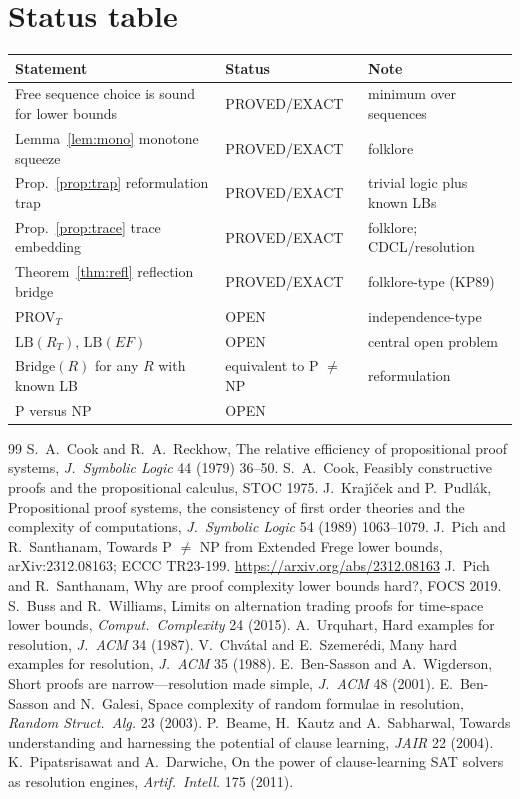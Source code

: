 \documentclass[11pt]{article}
\theoremstyle{definition}
\theoremstyle{remark}
\begin{document}
\section{Status table}
\begin{center}\small
\begin{tabular}{lll}
\toprule
Statement & Status & Note\\
\midrule
Free sequence choice is sound for lower bounds & PROVED/EXACT & minimum over sequences\\
Lemma~\ref{lem:mono} monotone squeeze & PROVED/EXACT & folklore\\
Prop.~\ref{prop:trap} reformulation trap & PROVED/EXACT & trivial logic plus known LBs\\
Prop.~\ref{prop:trace} trace embedding & PROVED/EXACT & folklore; CDCL/resolution\\
Theorem~\ref{thm:refl} reflection bridge & PROVED/EXACT & folklore-type (KP89)\\
PROV$_T$ & OPEN & independence-type\\
$\mathrm{LB}(R_T)$, $\mathrm{LB}(EF)$ & OPEN & central open problem\\
Bridge$(R)$ for any $R$ with known LB & equivalent to P $\ne$ NP & reformulation\\
P versus NP & OPEN & \\
\bottomrule
\end{tabular}
\end{center}

\begin{thebibliography}{99}
 S.~A.~Cook and R.~A.~Reckhow, The relative efficiency of propositional proof systems, \emph{J.\ Symbolic Logic} 44 (1979) 36--50.
 S.~A.~Cook, Feasibly constructive proofs and the propositional calculus, STOC 1975.
 J.~Kraj\'{\i}\v{c}ek and P.~Pudl\'ak, Propositional proof systems, the consistency of first order theories and the complexity of computations, \emph{J.\ Symbolic Logic} 54 (1989) 1063--1079.
 J.~Pich and R.~Santhanam, Towards P $\ne$ NP from Extended Frege lower bounds, arXiv:2312.08163; ECCC TR23-199. \url{https://arxiv.org/abs/2312.08163}
 J.~Pich and R.~Santhanam, Why are proof complexity lower bounds hard?, FOCS 2019.
 S.~Buss and R.~Williams, Limits on alternation trading proofs for time-space lower bounds, \emph{Comput.\ Complexity} 24 (2015).
 A.~Urquhart, Hard examples for resolution, \emph{J.\ ACM} 34 (1987).
 V.~Chv\'atal and E.~Szemer\'edi, Many hard examples for resolution, \emph{J.\ ACM} 35 (1988).
 E.~Ben-Sasson and A.~Wigderson, Short proofs are narrow---resolution made simple, \emph{J.\ ACM} 48 (2001).
 E.~Ben-Sasson and N.~Galesi, Space complexity of random formulae in resolution, \emph{Random Struct.\ Alg.} 23 (2003).
 P.~Beame, H.~Kautz and A.~Sabharwal, Towards understanding and harnessing the potential of clause learning, \emph{JAIR} 22 (2004).
 K.~Pipatsrisawat and A.~Darwiche, On the power of clause-learning SAT solvers as resolution engines, \emph{Artif.\ Intell.} 175 (2011).
\end{thebibliography}
\end{document}
